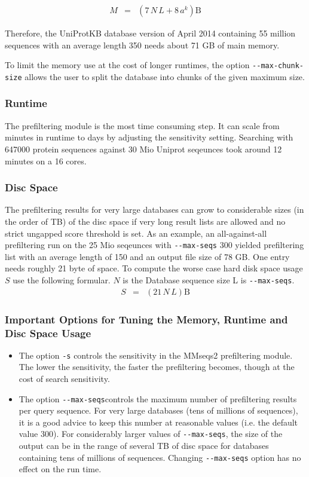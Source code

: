 \documentclass[11pt,a4paper]{scrreprt}
\begin{document}
\begin{eqnarray*}
M & = & (7\, N\, L+8\, a^{k})\mathrm{B}
\end{eqnarray*}

Therefore, the UniProtKB database version of April 2014 containing 55 million sequences with an average length 350 needs about 71 GB of main memory. 

To limit the memory use at the cost of longer runtimes, the option \texttt{-{}-max-chunk-size} allows the user to split the database into chunks of the given maximum size. 
\subsubsection{Runtime}
The prefiltering module is the most time consuming step. It can scale from minutes in runtime to days by adjusting the sensitivity setting. Searching with 647000 protein sequences against 30 Mio Uniprot seqeunces took around 12 minutes on a 16 cores.
\subsubsection{Disc Space}
The prefiltering results for very large databases can grow to considerable sizes (in the order of TB) of the disc space if very long result lists are allowed and no strict ungapped score threshold is set. As an example, an all-against-all prefiltering run on the 25 Mio seqeunces with \texttt{-{}-max-seqs} 300 yielded prefiltering list with an average length of 150 and an output file size of 78 GB. One entry needs roughly 21 byte of space. To compute the worse case hard disk space usage $S$  use the following formular. $N$ is the Database sequence size L is  \texttt{-{}-max-seqs}.
\begin{eqnarray*}
S & = & (21\, N\, L)\mathrm{B}
\end{eqnarray*}


\subsubsection{Important Options for Tuning the Memory, Runtime and Disc Space Usage}
\begin{itemize}
\item The option \texttt{-s} controls the sensitivity in the MMseqs2 prefiltering module. The lower the sensitivity, the faster the prefiltering becomes, though at the cost of search sensitivity. 
\item The option \texttt{-{}-max-seqs}controls the maximum number of prefiltering results per query sequence. For very large databases (tens of millions of sequences), it is a good advice to keep this number at reasonable values (i.e. the default value 300). For considerably larger values of \texttt{-{}-max-seqs}, the size of the output can be in the range of several TB of disc space for databases containing tens of millions of sequences. Changing \texttt{-{}-max-seqs} option has no effect on the run time.
\end{itemize}
\end{document}
